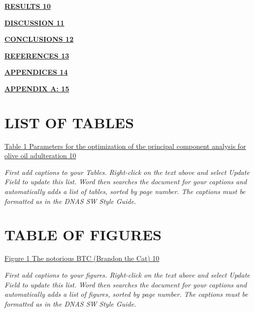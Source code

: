 \documentclass[
]{article}
\begin{document}
    \protect\hyperlink{results}{\textbf{RESULTS 10}}

    \protect\hyperlink{discussion}{\textbf{DISCUSSION 11}}

    \protect\hyperlink{conclusions}{\textbf{CONCLUSIONS 12}}

    \protect\hyperlink{references}{\textbf{REFERENCES 13}}

    \protect\hyperlink{appendices}{\textbf{APPENDICES 14}}

    \protect\hyperlink{_Toc93021181}{\textbf{APPENDIX A: 15}}

    \hypertarget{list-of-tables}{%


        \section{LIST OF TABLES}\label{list-of-tables}}

    \protect\hyperlink{_Toc93020061}{Table 1 Parameters for the optimization
    of the principal component analysis for olive oil adulteration 10}

    \emph{First add captions to your Tables. Right-click on the text above
    and select Update Field to update this list. Word then searches the
    document for your captions and automatically adds a list of tables,
        sorted by page number. The captions must be formatted as in the DNAS SW
        Style Guide}.

    \hypertarget{table-of-figures}{%


        \section{TABLE OF FIGURES}\label{table-of-figures}}

    \protect\hyperlink{_Toc93020444}{Figure 1 The notorious BTC (Brandon the
    Cat) 10}

    \emph{First add captions to your figures. Right-click on the text above
    and select Update Field to update this list. Word then searches the
    document for your captions and automatically adds a list of figures,
        sorted by page number. The captions must be formatted as in the DNAS SW
        Style Guide}.

    \hypertarget{section-1}{%


        \section{}\label{section-1}}
\end{document}
